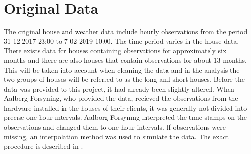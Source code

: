 \section{Original Data}
The original house and weather data include hourly observations from the period 31-12-2017 23:00 to 7-02-2019 10:00. The time period varies in the house data. There exists data for houses containing observations for approximately six months and there are also houses that contain observations for about 13 months. This will be taken into account when cleaning the data and in the analysis the two groups of houses will be referred to as the long and short houses.
\noindent Before the data was provided to this project, it had already been slightly altered. When Aalborg Forsyning, who provided the data, recieved the observations from the hardware installed in the houses of their clients, it was generally not divided into precise one hour intervals. Aalborg Forsyning interpreted the time stamps on the observations and changed them to one hour intervals. If observations were missing, an interpolation method was used to simulate the data. The exact procedure is described in \cite{interpolation}. \\


